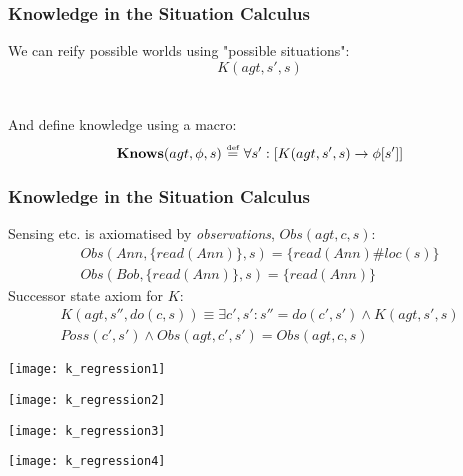 \documentclass[compress]{beamer}
\newcommand{\isdef}{\hbox{$\stackrel{\mbox{\tiny def}}{=}$}}
\newcommand{\Knows}{\mathbf{Knows}}
\begin{document}
\begin{frame}
\frametitle{Knowledge in the Situation Calculus}
We can reify possible worlds using "possible situations":
\begin{equation*}
 K(agt,s',s)
\end{equation*}
\ \\
\ \\
And define knowledge using a macro:
\begin{equation*}
\Knows(agt,\phi,s)\,\,\isdef\,\,\forall s': \left[ K(agt,s',s) \rightarrow \phi[s']\right]
\end{equation*}
\end{frame}

\begin{frame}
\frametitle{Knowledge in the Situation Calculus}
Sensing etc. is axiomatised by \emph{observations}, $Obs(agt,c,s)$:
\begin{gather*}
Obs(Ann,\{read(Ann)\},s) = \{read(Ann)\#loc(s)\}\\
Obs(Bob,\{read(Ann)\},s) = \{read(Ann)\}
\end{gather*}
\pause
Successor state axiom for $K$:
\begin{multline*}
K(agt,s'',do(c,s)) \equiv \exists c',s': s'' = do(c',s') \wedge K(agt,s',s)\\
  Poss(c',s') \wedge Obs(agt,c',s') = Obs(agt,c,s)
\end{multline*}
\end{frame}

\begin{frame}
\begin{center}
  \texttt{[image: k\_regression1]}
\end{center}
\end{frame}

\begin{frame}
\begin{center}
  \texttt{[image: k\_regression2]}
\end{center}
\end{frame}

\begin{frame}
\begin{center}
  \texttt{[image: k\_regression3]}
\end{center}
\end{frame}

\begin{frame}
\begin{center}
  \texttt{[image: k\_regression4]}
\end{center}
\end{frame}
\end{document}
